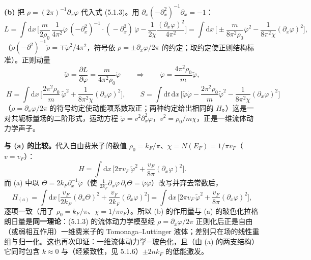 \textbf{(b)} 把 $\rho=(2\pi)^{-1}\partial_x\varphi$ 代入式 (5.1.3)。用 $\partial_x(-\partial_x^{2})^{-1}\partial_x=-1$：
\begin{equation*}
L=\int\mathrm{d}x\,\Big[\frac{m}{2\rho_0}\,\frac{1}{4\pi^{2}}\dot\varphi\,(-\partial_x^{2})^{-1}\!\cdot(\!-\partial_x^{2})\,\dot\varphi
-\frac{1}{2\chi}\frac{(\partial_x\varphi)^{2}}{4\pi^{2}}\Big]
=\int\mathrm{d}x\,\Big[\pm\frac{m}{8\pi^{2}\rho_0}\dot\varphi^{2}-\frac{1}{8\pi^{2}\chi}(\partial_x\varphi)^{2}\Big],
\end{equation*}
（$\dot\rho(-\partial^{2})^{-1}\dot\rho=\mp\dot\varphi^{2}/4\pi^{2}$，符号依 $\rho=\pm\partial_x\varphi/2\pi$ 的约定；取约定使正则结构标准）。正则动量
\begin{equation*}
\tilde\varphi=\frac{\partial L}{\partial\dot\varphi}=\frac{m}{4\pi^{2}\rho_0}\dot\varphi
\qquad\Longrightarrow\qquad
\dot\varphi=\frac{4\pi^{2}\rho_0}{m}\tilde\varphi ,
\end{equation*}
\begin{equation*}
\boxed{\;H=\int\mathrm{d}x\,\Big[\frac{2\pi^{2}\rho_0}{m}\,\tilde\varphi^{2}+\frac{1}{8\pi^{2}\chi}(\partial_x\varphi)^{2}\Big],
\qquad
S=\int\mathrm{d}t\,\mathrm{d}x\,\Big[\tilde\varphi\dot\varphi-\frac{2\pi^{2}\rho_0}{m}\tilde\varphi^{2}-\frac{1}{8\pi^{2}\chi}(\partial_x\varphi)^{2}\Big]\;}
\end{equation*}
（$\rho=\partial_x\varphi/2\pi$ 的符号约定使动能项系数取正；两种约定给出相同的 $H$。）这是一对共轭标量场的二阶形式，运动方程 $\ddot\varphi=v^{2}\partial_x^{2}\varphi$，$v^{2}=\rho_0/m\chi$，正是一维流体动力学声子。

\textbf{与 (a) 的比较。}代入自由费米子的数值 $\rho_0=k_F/\pi$、$\chi=N(E_F)=1/\pi v_F$（$v=v_F$）：
\begin{equation*}
H=\int\mathrm{d}x\,\Big[2\pi v_F\,\tilde\varphi^{2}+\frac{v_F}{8\pi}(\partial_x\varphi)^{2}\Big].
\end{equation*}
而 (a) 中以 $\Theta=2k_F\partial_x^{-1}\tilde\varphi$（使 $\frac{1}{2k_F}\partial_x\varphi\,\partial_t\Theta=\tilde\varphi\dot\varphi$）改写并弃去常数后，
\begin{equation*}
H_{(a)}=\int\mathrm{d}x\,\Big[\frac{v_F}{2k_F}(\partial_x\Theta)^{2}+\frac{v_F}{2k_F}(\partial_x\varphi)^{2}\Big]
=\int\mathrm{d}x\,\Big[2\pi v_F\,\tilde\varphi^{2}+\frac{v_F}{8\pi}(\partial_x\varphi)^{2}\Big],
\end{equation*}
逐项一致（用了 $\rho_0=k_F/\pi$、$\chi=1/\pi v_F$）。所以 (b) 的作用量与 (a) 的玻色化拉格朗日量是\textbf{同一理论}：(5.1.3) 的流体动力学模型经 $\rho=\partial_x\varphi/2\pi$ 正则化后正是自由（或弱相互作用）一维费米子的 Tomonaga--Luttinger 液体；差别只在场的线性重组与归一化。这也再次印证：一维流体动力学=玻色化，且（由 (a) 的两支结构）它同时包含 $k\approx0$ 与（经紧致性，见 5.1.6）$\pm2nk_F$ 的低能激发。

